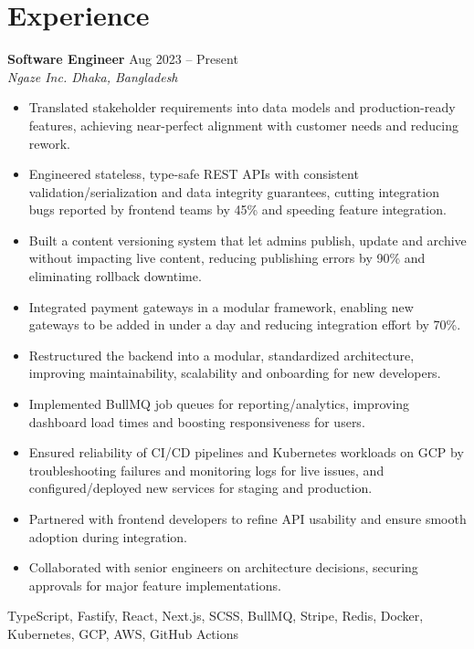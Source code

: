 \documentclass[a4paper,10pt]{article}
\begin{document}
\section*{Experience}

\textbf{Software Engineer} \hfill Aug 2023 -- Present\\[-2pt]
\textit{Ngaze Inc. \textbar{} Dhaka, Bangladesh}\\[-4pt]
\begin{itemize}
  \item Translated stakeholder requirements into data models and production-ready features, achieving near-perfect alignment with customer needs and reducing rework.
  \item Engineered stateless, type-safe REST APIs with consistent validation/serialization and data integrity guarantees, cutting integration bugs reported by frontend teams by 45\% and speeding feature integration.
  \item Built a content versioning system that let admins publish, update and archive without impacting live content, reducing publishing errors by 90\% and eliminating rollback downtime.
  \item Integrated payment gateways in a modular framework, enabling new gateways to be added in under a day and reducing integration effort by 70\%.
  \item Restructured the backend into a modular, standardized architecture, improving maintainability, scalability and onboarding for new developers.
  \item Implemented BullMQ job queues for reporting/analytics, improving dashboard load times and boosting responsiveness for users.
  \item Ensured reliability of CI/CD pipelines and Kubernetes workloads on GCP by troubleshooting failures and monitoring logs for live issues, and configured/deployed new services for staging and production.
  \item Partnered with frontend developers to refine API usability and ensure smooth adoption during integration.
  \item Collaborated with senior engineers on architecture decisions, securing approvals for major feature implementations.
\end{itemize}
{\footnotesize\textsf{TypeScript, Fastify, React, Next.js, SCSS, BullMQ, Stripe, Redis, Docker, Kubernetes, GCP, AWS, GitHub Actions}}

\vspace{2pt}
\end{document}
